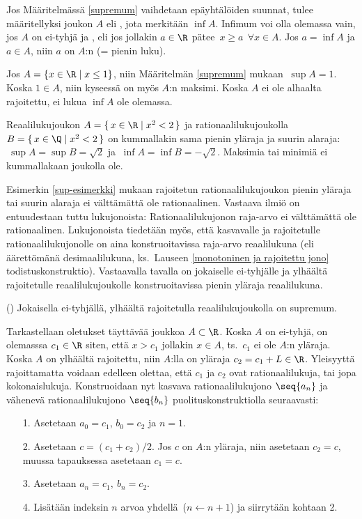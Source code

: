 Jos Määritelmässä \ref{supremum} vaihdetaan epäyhtälöiden suunnat, tulee määritellyksi joukon 
$A$  eli , jota merkitään $\inf A$. Infimum voi olla olemassa
%
vain, jos $A$ on ei-tyhjä ja , eli jos jollakin $a \in \R$ pätee 
$\,x \ge a\ \ \forall x \in A$. Jos $a=\inf A$ ja $a \in A$, niin $a$ on $A$:n  
(= pienin luku).
\begin{Exa} Jos $A = \{x \in \R \mid x \le 1\}$, niin Määritelmän \ref{supremum} mukaan 
$\ \sup A = 1$. Koska $1 \in A$, niin kyseessä on myös $A$:n maksimi. Koska $A$ ei ole alhaalta
rajoitettu, ei lukua $\inf A$ ole olemassa. 
\end{Exa}
\begin{Exa} \label{sup-esimerkki} Reaalilukujoukon $A = \{\,x \in \R \mid x^2 < 2\,\}$ ja 
rationaalilukujoukolla $B = \{\,x \in \Q \mid x^2 < 2\,\}$ on kummallakin sama pienin yläraja
ja suurin alaraja: $\ \sup A = \sup B = \sqrt{2}$ ja $\ \inf A = \inf B = -\sqrt{2}$. Maksimia
tai minimiä ei kummallakaan joukolla ole. \loppu 
\end{Exa}
Esimerkin \ref{sup-esimerkki} mukaan rajoitetun rationaalilukujoukon pienin yläraja tai suurin
alaraja ei välttämättä ole rationaalinen. Vastaava ilmiö on entuudestaan tuttu lukujonoista:
Rationaalilukujonon raja-arvo ei välttämättä ole rationaalinen. Lukujonoista tiedetään myös,
että kasvavalle ja rajoitetulle rationaalilukujonolle on aina konstruoitavissa raja-arvo 
reaalilukuna (eli äärettömänä desimaalilukuna, ks.\ Lauseen \ref{monotoninen ja rajoitettu jono}
todistuskonstruktio). Vastaavalla tavalla on jokaiselle ei-tyhjälle ja ylhäältä rajoitetulle
reaalilukujoukolle konstruoitavissa pienin yläraja reaalilukuna.
\begin{*Lause} () \label{supremum-lause} Jokaisella ei-tyhjällä, ylhäältä
rajoitetulla reaalilukujoukolla on supremum. 
\end{*Lause}
\tod Tarkastellaan oletukset täyttävää joukkoa $A \subset \R$. Koska $A$ on ei-tyhjä, on
olemasssa $c_1 \in \R$ siten, että $x>c_1$ jollakin $x \in A$, ts.\ $c_1$ ei ole $A$:n yläraja.
Koska $A$ on ylhäältä rajoitettu, niin $A$:lla on yläraja $c_2 = c_1 + L \in \R$. Yleisyyttä 
rajoittamatta voidaan edelleen olettaa, että $c_1$ ja $c_2$ ovat rationaalilukuja, tai jopa 
kokonaislukuja. Konstruoidaan nyt kasvava rationaalilukujono $\seq{a_n}$ ja vähenevä 
rationaalilukujono $\seq{b_n}$ puolituskonstruktiolla seuraavasti:
\begin{itemize}
\item[1.] Asetetaan $a_0=c_1$, $b_0=c_2$ ja $n=1$.
\item[2.] Asetetaan $c = (c_1 + c_2)/2$. Jos $c$ on $A$:n yläraja, niin asetetaan $c_2=c$,
          muussa tapauksessa asetetaan $c_1=c$. 
\item[3.] Asetetaan $a_n=c_1,\ b_n=c_2$.
\item[4.] Lisätään indeksin $n$ arvoa yhdellä\ ($n \leftarrow n+1$) ja siirrytään kohtaan 2.
\end{itemize}
